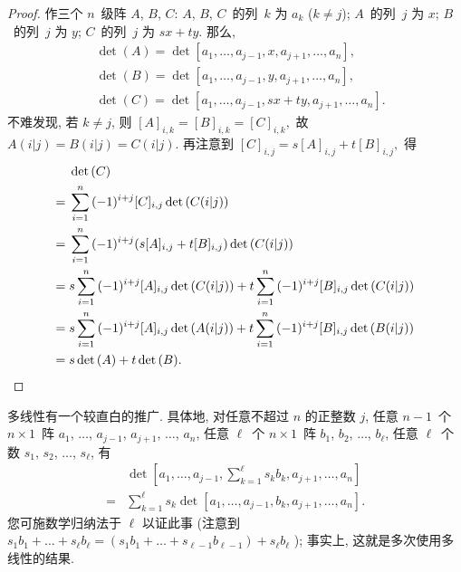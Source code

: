 \documentclass[%
    UTF8,%
    fontset=none,%
    punct=kaiming,%
    zihao=-4,%
    a4paper,%
    oneside,%
]{ctexbook}
\begin{document}
\begin{proof}
    作三个 \(n\)~级阵 \(A\), \(B\), \(C\):
    \(A\), \(B\), \(C\)~的列~\(k\) 为 \(a_k\) (\(k \neq j\));
    \(A\)~的列~\(j\) 为 \(x\);
    \(B\)~的列~\(j\) 为 \(y\);
    \(C\)~的列~\(j\) 为 \(sx + ty\).
    那么,
    \begin{align*}
         & \det {(A)}
        = \det
        {[a_1, \dots, a_{j-1}, x, a_{j+1}, \dots, a_n]},
        \\
         & \det {(B)}
        = \det
        {[a_1, \dots, a_{j-1}, y, a_{j+1}, \dots, a_n]},
        \\
         & \det {(C)}
        = \det
        {[a_1, \dots, a_{j-1}, sx + ty, a_{j+1}, \dots, a_n]}.
    \end{align*}
    不难发现, 若 \(k \neq j\), 则
    \(
    [A]_{i,k} = [B]_{i,k} = [C]_{i,k},
    \)
    故
    \(
    A(i|j) = B(i|j) = C(i|j).
    \)
    再注意到
    \(
    [C]_{i,j} = s[A]_{i,j} + t[B]_{i,j},
    \)
    得
    \begin{align*}
             & \det {(C)}
        \\
        = {} &
        \sum_{i = 1}^{n} {
        (-1)^{i+j} [C]_{i,j} \det {(C(i|j))}
        }
        \\
        = {} &
        \sum_{i = 1}^{n} {
        (-1)^{i+j} (s[A]_{i,j} + t[B]_{i,j}) \det {(C(i|j))}
        }
        \\
        = {} &
        s\sum_{i = 1}^{n} {
        (-1)^{i+j} [A]_{i,j} \det {(C(i|j))}
        }
        +
        t\sum_{i = 1}^{n} {
        (-1)^{i+j} [B]_{i,j} \det {(C(i|j))}
        }
        \\
        = {} &
        s\sum_{i = 1}^{n} {
        (-1)^{i+j} [A]_{i,j} \det {(A(i|j))}
        }
        +
        t\sum_{i = 1}^{n} {
        (-1)^{i+j} [B]_{i,j} \det {(B(i|j))}
        }
        \\
        = {} &
        s \det{(A)} + t \det{(B)}.
        \qedhere
    \end{align*}
\end{proof}

多线性有一个较直白的推广.
具体地,
对任意不超过 \(n\) 的正整数 \(j\),
任意 \(n-1\)~个 \(n \times 1\)~阵
\(a_1\), \(\dots\), \(a_{j-1}\),
\(a_{j+1}\), \(\dots\), \(a_n\),
任意 \(\ell\)~个 \(n \times 1\)~阵
\(b_1\), \(b_2\), \(\dots\), \(b_\ell\),
任意 \(\ell\)~个数
\(s_1\), \(s_2\), \(\dots\), \(s_\ell\),
有
\begin{align*}
         & \det
    {\left[
            a_1, \dots, a_{j-1},
            \sum_{k = 1}^{\ell} {s_k b_k},
            a_{j+1}, \dots, a_n
            \right]}
    \\
    = {} &
    \sum_{k = 1}^{\ell}
    {s_k
    \det {[a_1, \dots, a_{j-1},
                b_k,
                a_{j+1}, \dots, a_n]}}.
\end{align*}
您可施数学归纳法于 \(\ell\) 以证此事
(注意到
\(
s_1 b_1 + \dots + s_\ell b_\ell
= (s_1 b_1 + \dots + s_{\ell-1} b_{\ell-1}) + s_\ell b_\ell
\)%
);
事实上, 这就是多次使用多线性的结果.
\end{document}
